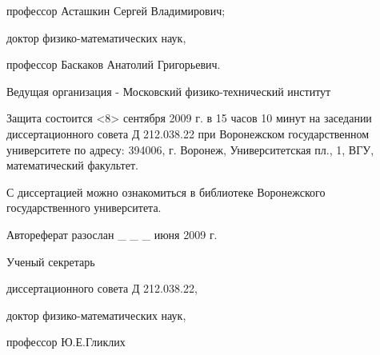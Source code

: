 \documentclass[12pt]{article}
\begin{document}
\hspace{25mm}профессор Асташкин Сергей Владимирович;

\vspace{10mm}

\hspace{25mm}доктор физико-математических наук,

\hspace{25mm}профессор Баскаков Анатолий Григорьевич.


\bigskip

Ведущая организация - Московский физико-технический институт

\vspace{10mm}

Защита состоится <8> сентября 2009 г. в 15 часов 10 минут на
заседании диссертационного совета Д 212.038.22 при Воронежском
государственном университете по адресу: 394006, г. Воронеж,
Университетская пл., 1, ВГУ, математический факультет.

\vspace{5mm}

С диссертацией можно ознакомиться в библиотеке Воронежского
государственного университета.

\vspace{10mm}

Автореферат разослан \_ \_ \_ июня 2009 г.

\vspace{10mm}

Ученый секретарь

\noindent диссертационного совета Д 212.038.22,

\noindent доктор физико-математических наук,

\noindent профессор \hspace{110mm}Ю.Е.Гликлих
\end{document}
